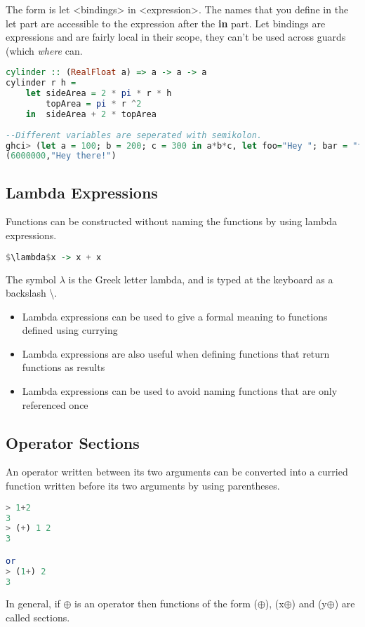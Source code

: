 The form is let <bindings> in <expression>. The names that you define in the let part are accessible to the expression after the \textbf{in} part. Let bindings are expressions and are fairly local in their scope, they can't be used across guards (which \textit{where} can.

\begin{lstlisting}[language=Haskell]
cylinder :: (RealFloat a) => a -> a -> a  
cylinder r h = 
    let sideArea = 2 * pi * r * h  
        topArea = pi * r ^2  
    in  sideArea + 2 * topArea  
    
--Different variables are seperated with semikolon.
ghci> (let a = 100; b = 200; c = 300 in a*b*c, let foo="Hey "; bar = "there!" in foo ++ bar)  
(6000000,"Hey there!") 
\end{lstlisting}

\hypertarget{lambda-expressions}{%
\subsection{Lambda Expressions}\label{lambda-expressions}}

Functions can be constructed without naming the functions by using
lambda expressions.

\begin{lstlisting}[language=Haskell]
$\lambda$x -> x + x
\end{lstlisting}

The symbol $\lambda$ is the Greek letter lambda, and is typed at the keyboard as a backslash \textbackslash{}.

\begin{itemize}
\tightlist
\item
  Lambda expressions can be used to give a formal meaning to functions
  defined using currying
\item
  Lambda expressions are also useful when defining functions that return
  functions as results
\item
  Lambda expressions can be used to avoid naming functions that are only
  referenced once
\end{itemize}

\hypertarget{operator-sections}{%
\subsection{Operator Sections}\label{operator-sections}}

An operator written between its two arguments can be converted into a
curried function written before its two arguments by using parentheses.

\begin{lstlisting}[language=Haskell]
> 1+2
3
> (+) 1 2
3

or
> (1+) 2
3
\end{lstlisting}

In general, if $\oplus$ is an operator then functions of the form ($\oplus$), (x$\oplus$) and (y$\oplus$) are called sections.

\clearpage
